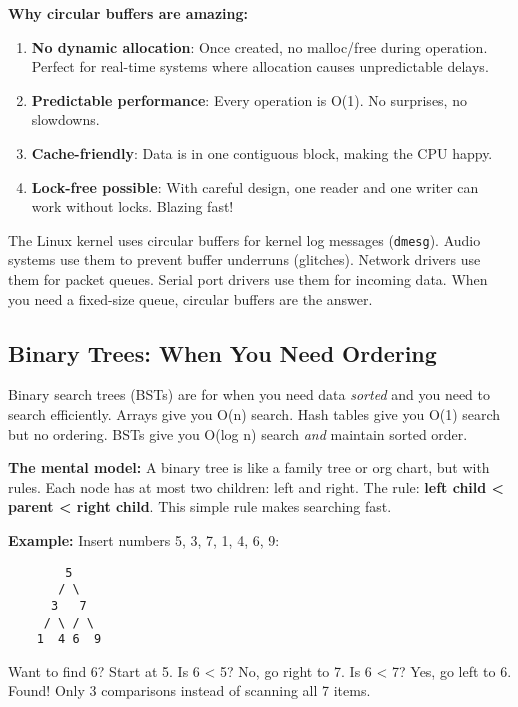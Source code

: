 \begin{tipbox}
\textbf{Why circular buffers are amazing:}

\begin{enumerate}
    \item \textbf{No dynamic allocation}: Once created, no malloc/free during operation. Perfect for real-time systems where allocation causes unpredictable delays.

    \item \textbf{Predictable performance}: Every operation is O(1). No surprises, no slowdowns.

    \item \textbf{Cache-friendly}: Data is in one contiguous block, making the CPU happy.

    \item \textbf{Lock-free possible}: With careful design, one reader and one writer can work without locks. Blazing fast!
\end{enumerate}

The Linux kernel uses circular buffers for kernel log messages (\texttt{dmesg}). Audio systems use them to prevent buffer underruns (glitches). Network drivers use them for packet queues. Serial port drivers use them for incoming data. When you need a fixed-size queue, circular buffers are the answer.
\end{tipbox}

\subsection{Binary Trees: When You Need Ordering}

Binary search trees (BSTs) are for when you need data \textit{sorted} and you need to search efficiently. Arrays give you O(n) search. Hash tables give you O(1) search but no ordering. BSTs give you O(log n) search \textit{and} maintain sorted order.

\textbf{The mental model:} A binary tree is like a family tree or org chart, but with rules. Each node has at most two children: left and right. The rule: \textbf{left child < parent < right child}. This simple rule makes searching fast.

\textbf{Example:} Insert numbers 5, 3, 7, 1, 4, 6, 9:
\begin{verbatim}
        5
       / \
      3   7
     / \ / \
    1  4 6  9
\end{verbatim}

Want to find 6? Start at 5. Is 6 < 5? No, go right to 7. Is 6 < 7? Yes, go left to 6. Found! Only 3 comparisons instead of scanning all 7 items.

